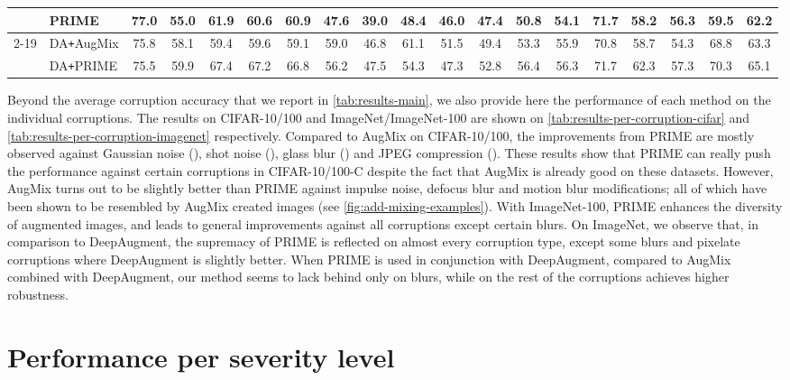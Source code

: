 \documentclass[runningheads]{llncs}
\begin{document}
\begin{table*}[tbp]
{\begin{tabular}{clcc|ccc|cccc|cccc|cccc}
        & PRIME & 77.0 & 55.0 & 61.9 & 60.6 & 60.9 & 47.6 & 39.0 & 48.4 & 46.0 & 47.4 & 50.8 & 54.1 & 71.7 & 58.2 & 56.3 & 59.5 & 62.2\\
\cmidrule{2-19}
        & DA\texttt{+}AugMix & 75.8 & 58.1 & 59.4 & 59.6 & 59.1 & 59.0 & 46.8 & 61.1 & 51.5 & 49.4 & 53.3 & 55.9 & 70.8 & 58.7 & 54.3 & 68.8 & 63.3 \\
        & DA\texttt{+}PRIME & 75.5 & 59.9 & 67.4 & 67.2 & 66.8 & 56.2 & 47.5 & 54.3 & 47.3 & 52.8 & 56.4 & 56.3 & 71.7 & 62.3 & 57.3 & 70.3 & 65.1 \\
\bottomrule
    \end{tabular}}
    \label{tab:results-per-corruption-imagenet}
\end{table*}

Beyond the average corruption accuracy that we report in \cref{tab:results-main}, we also provide here the performance of each method on the individual corruptions. The results on CIFAR-10/100 and ImageNet/ImageNet-100 are shown on \cref{tab:results-per-corruption-cifar} and \cref{tab:results-per-corruption-imagenet} respectively. Compared to AugMix on CIFAR-10/100, the improvements from PRIME are mostly observed against Gaussian noise (), shot noise (), glass blur () and JPEG compression (). These results show that PRIME can really push the performance against certain corruptions in CIFAR-10/100-C despite the fact that AugMix is already good on these datasets. However, AugMix turns out to be slightly better than PRIME against impulse noise, defocus blur and motion blur modifications; all of which have been shown to be resembled by AugMix created images (see \cref{fig:add-mixing-examples}). With ImageNet-100, PRIME enhances the diversity of augmented images, and leads to general improvements against all corruptions except certain blurs.
On ImageNet, we observe that, in comparison to DeepAugment, the supremacy of PRIME is reflected on almost every corruption type, except some blurs and pixelate corruptions where DeepAugment is slightly better. When PRIME is used in conjunction with DeepAugment, compared to AugMix combined with DeepAugment, our method seems to lack behind only on blurs, while on the rest of the corruptions achieves higher robustness.


\section{Performance per severity level}
\end{document}
